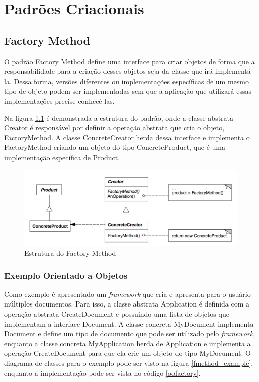 \chapter{Padrões Criacionais}

\section{Factory Method}

O padrão Factory Method define uma interface 
para criar objetos de forma que a responsabilidade 
para a criação desses objetos seja da classe que 
irá implementá-la. Dessa forma, versões diferentes 
ou implementações específicas de um mesmo tipo 
de objeto podem ser implementadas sem que a 
aplicação que utilizará essas implementações 
precise conhecê-las.

Na figura \ref{fmethod_struct} é demonstrada 
a estrutura do padrão, onde a classe abstrata Creator 
é responsável por definir a operação abstrata 
que cria o objeto, FactoryMethod. A classe 
ConcreteCreator herda dessa interface e 
implementa o FactoryMethod criando um objeto 
do tipo ConcreteProduct, que é uma implementação 
específica de Product.

\begin{figure}[htb]
	\caption{\label{fmethod_struct}Estrutura do Factory Method}
	\begin{center}
	    \includegraphics[scale=0.4]{5_padroes-contexto-funcional/5.1_criacionais/5.1.1_factory-method/diagram.png}
	\end{center}
\end{figure}


\subsection*{Exemplo Orientado a Objetos}

Como exemplo é apresentado um \textit{framework} 
que cria e apresenta para o usuário múltiplos 
documentos. Para isso, a classe abstrata 
Application é definida com a operação abstrata 
CreateDocument e possuindo uma lista de objetos 
que implementam a interface Document. A classe 
concreta MyDocument implementa Document e define 
um tipo de documento que pode ser utilizado pelo 
\textit{framework}, enquanto a classe concreta 
MyApplication herda de Application e implementa 
a operação CreateDocument para que ela crie 
um objeto do tipo MyDocument. O diagrama de classes 
para o exemplo pode ser visto na figura \ref{fmethod_example}, 
enquanto a implementação pode ser vista no 
código \ref{oofactory}.


